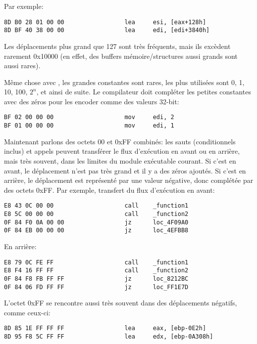 Par exemple:

\begin{lstlisting}[style=customasmx86]
8D B0 28 01 00 00                 lea     esi, [eax+128h]
8D BF 40 38 00 00                 lea     edi, [edi+3840h]
\end{lstlisting}

Les déplacements plus grand que 127 sont très fréquents, mais ils excèdent rarement
0x10000 (en effet, des buffers mémoire/structures aussi grands sont aussi rares).

Même chose avec , les grandes constantes sont rares, les plus utilisées sont
0, 1, 10, 100, $2^n$, et ainsi de suite.
Le compilateur doit compléter les petites constantes avec des zéros pour les encoder
comme des valeurs 32-bit:

\begin{lstlisting}[style=customasmx86]
BF 02 00 00 00                    mov     edi, 2
BF 01 00 00 00                    mov     edi, 1
\end{lstlisting}

Maintenant parlons des octets 00 et 0xFF combinés: les sauts (conditionnels inclus)
et appels peuvent transférer le flux d'exécution en avant ou en arrière, mais très
souvent, dans les limites du module exécutable courant.
Si c'est en avant, le déplacement n'est pas très grand et il y a des zéros ajoutés.
Si c'est en arrière, le déplacement est représenté par une valeur négative, donc
complétée par des octets 0xFF.
Par exemple, transfert du flux d'exécution en avant:

\begin{lstlisting}[style=customasmx86]
E8 43 0C 00 00                    call    _function1
E8 5C 00 00 00                    call    _function2
0F 84 F0 0A 00 00                 jz      loc_4F09A0
0F 84 EB 00 00 00                 jz      loc_4EFBB8
\end{lstlisting}

En arrière:

\begin{lstlisting}[style=customasmx86]
E8 79 0C FE FF                    call    _function1
E8 F4 16 FF FF                    call    _function2
0F 84 F8 FB FF FF                 jz      loc_8212BC
0F 84 06 FD FF FF                 jz      loc_FF1E7D
\end{lstlisting}

L'octet 0xFF se rencontre aussi très souvent dans des déplacements négatifs, comme
ceux-ci:

\begin{lstlisting}[style=customasmx86]
8D 85 1E FF FF FF                 lea     eax, [ebp-0E2h]
8D 95 F8 5C FF FF                 lea     edx, [ebp-0A308h]
\end{lstlisting}

